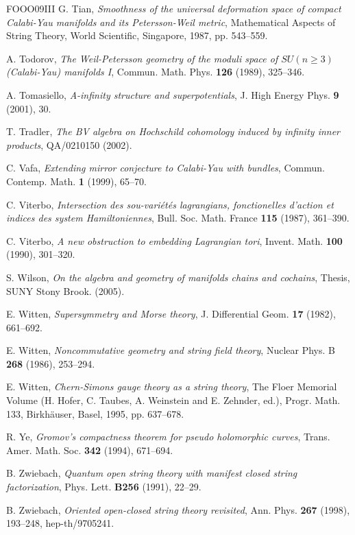\begin{thebibliography}{FOOO09III}
 G. Tian, \emph{Smoothness of the universal deformation space of compact Calabi-Yau manifolds and its Petersson-Weil metric}, Mathematical Aspects of String Theory, World Scientific, Singapore, 1987, pp. 543–559.

 A. Todorov, \emph{The Weil-Petersson geometry of the moduli space of \(SU(n\ge 3)\) (Calabi-Yau) manifolds I}, Commun. Math. Phys. \textbf{126} (1989), 325–346.

 A. Tomasiello, \emph{A-infinity structure and superpotentials}, J. High Energy Phys. \textbf{9} (2001), 30.

 T. Tradler, \emph{The BV algebra on Hochschild cohomology induced by infinity inner products}, QA/0210150 (2002).

 C. Vafa, \emph{Extending mirror conjecture to Calabi-Yau with bundles}, Commun. Contemp. Math. \textbf{1} (1999), 65–70.

 C. Viterbo, \emph{Intersection des sou-variétés lagrangians, fonctionelles d'action et indices des system Hamiltoniennes}, Bull. Soc. Math. France \textbf{115} (1987), 361–390.

 C. Viterbo, \emph{A new obstruction to embedding Lagrangian tori}, Invent. Math. \textbf{100} (1990), 301–320.

 S. Wilson, \emph{On the algebra and geometry of manifolds chains and cochains}, Thesis, SUNY Stony Brook. (2005).

 E. Witten, \emph{Supersymmetry and Morse theory}, J. Differential Geom. \textbf{17} (1982), 661–692.

 E. Witten, \emph{Noncommutative geometry and string field theory}, Nuclear Phys. B \textbf{268} (1986), 253–294.

 E. Witten, \emph{Chern-Simons gauge theory as a string theory}, The Floer Memorial Volume (H. Hofer, C. Taubes, A. Weinstein and E. Zehnder, ed.), Progr. Math. 133, Birkhäuser, Basel, 1995, pp. 637–678.

 R. Ye, \emph{Gromov's compactness theorem for pseudo holomorphic curves}, Trans. Amer. Math. Soc. \textbf{342} (1994), 671–694.

 B. Zwiebach, \emph{Quantum open string theory with manifest closed string factorization}, Phys. Lett. \textbf{B256} (1991), 22–29.

 B. Zwiebach, \emph{Oriented open-closed string theory revisited}, Ann. Phys. \textbf{267} (1998), 193–248, hep-th/9705241.

\end{thebibliography}
\endgroup

